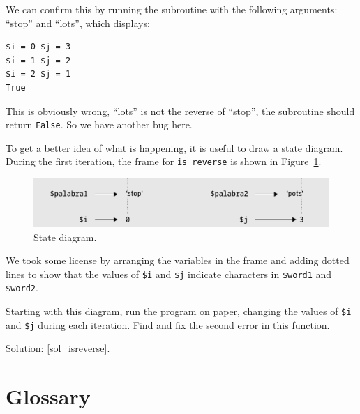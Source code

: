We can confirm this by running the subroutine with the 
following arguments: ``stop'' and ``lots'', which displays:

\begin{verbatim}
$i = 0 $j = 3
$i = 1 $j = 2
$i = 2 $j = 1
True
\end{verbatim}
%

This is obviously wrong, ``lots'' is not the reverse of 
``stop'', the subroutine should return {\tt False}. So we 
have another bug here.

To get a better idea of what is
happening, it is useful to draw a state diagram.  During the first
iteration, the frame for \verb"is_reverse" is shown in
Figure~\ref{fig.state4}.   

\begin{figure}
\centerline
{\includegraphics[scale=0.5]{figs/state6.pdf}}
\caption{State diagram.}
\label{fig.state4}
\end{figure}

We took some license by arranging the variables in the frame
and adding dotted lines to show that the values of {\tt \$i} 
and {\tt \$j} indicate characters in {\tt \$word1} and 
{\tt \$word2}.

Starting with this diagram, run the program on paper, changing 
the values of {\tt \$i} and {\tt \$j} during each iteration. 
Find and fix the second error in this function.

Solution: \ref{sol_isreverse}.
\label{isreverse}


\section{Glossary}

